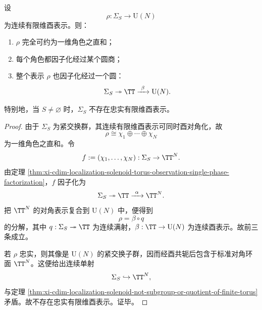 \begin{corollary}\label{cor:xi-cdim-localization-solenoid-finite-dimensional-unitary-representations-from-circle}
设
\[
\rho:\Sigma_S\longrightarrow \mathrm{U}(N)
\]
为连续有限维酉表示。则：
\begin{enumerate}
  \item \(\rho\) 完全可约为一维角色之直和；
  \item 每个角色都因子化经过某个圆商；
  \item 整个表示 \(\rho\) 也因子化经过一个圆：
  \[
  \Sigma_S\twoheadrightarrow \TT\xrightarrow{\ \beta\ }\mathrm{U}(N).
  \]
\end{enumerate}
特别地，当 \(S\neq\varnothing\) 时，\(\Sigma_S\) 不存在忠实有限维酉表示。
\end{corollary}
\begin{proof}
由于 \(\Sigma_S\) 为紧交换群，其连续有限维酉表示可同时酉对角化，故
\[
\rho\cong \chi_1\oplus\cdots\oplus\chi_N
\]
为一维角色之直和。令
\[
f:=(\chi_1,\dots,\chi_N):\Sigma_S\to \TT^N.
\]
由定理 \ref{thm:xi-cdim-localization-solenoid-torus-observation-single-phase-factorization}，\(f\) 因子化为
\[
\Sigma_S\twoheadrightarrow \TT\xrightarrow{\ \alpha\ }\TT^N.
\]
把 \(\TT^N\) 的对角表示复合到 \(\mathrm{U}(N)\) 中，便得到
\[
\rho=\beta\circ q
\]
的分解，其中 \(q:\Sigma_S\twoheadrightarrow \TT\) 为连续满射，\(\beta:\TT\to \mathrm{U}(N)\) 为连续酉表示。故前三条成立。

若 \(\rho\) 忠实，则其像是 \(\mathrm{U}(N)\) 的紧交换子群，因而经酉共轭后包含于标准对角环面 \(\TT^N\)。这便给出连续单射
\[
\Sigma_S\hookrightarrow \TT^N,
\]
与定理 \ref{thm:xi-cdim-localization-solenoid-not-subgroup-or-quotient-of-finite-torus} 矛盾。故不存在忠实有限维酉表示。证毕。
\end{proof}


